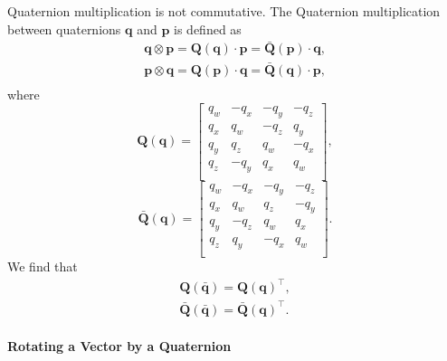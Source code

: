 \documentclass[12pt,a4paper,fleqn]{article}
\newcommand{\qx}[0]{\ensuremath{q_x}}
\newcommand{\qy}[0]{\ensuremath{q_y}}
\newcommand{\qz}[0]{\ensuremath{q_z}}
\newcommand{\qw}[0]{\ensuremath{q_w}}
\newcommand{\bVec}[1]{\mathbf{#1}}
\begin{document}
Quaternion multiplication is not commutative. 
The Quaternion multiplication between quaternions $\bVec{q}$ and $\bVec{p}$ is defined as
%
\begin{align}
\bVec{q} \otimes \bVec{p} = \bVec{Q}\left(\bVec{q}\right) \cdot \bVec{p} = \bar{\bVec{Q}}\left(\bVec{p}\right) \cdot \bVec{q},\\
%
\bVec{p} \otimes \bVec{q} = \bVec{Q}\left(\bVec{p}\right) \cdot \bVec{q} = \bar{\bVec{Q}}\left(\bVec{q}\right)\cdot \bVec{p},\\
\end{align}
%
where 
%
\begin{equation}
\bVec{Q}\left(\bVec{q}\right) = 
\begin{bmatrix} 
	\qw & -\qx & -\qy & -\qz \\ 
	\qx &  \qw & -\qz &  \qy \\
	\qy &  \qz &  \qw & -\qx \\
	\qz & -\qy &  \qx &  \qw \\
\end{bmatrix},
\end{equation}
%
\begin{equation}
\bar{\bVec{Q}}\left(\bVec{q}\right) = 
\begin{bmatrix} 
	\qw & -\qx & -\qy & -\qz \\ 
	\qx &  \qw &  \qz & -\qy \\
	\qy & -\qz &  \qw &  \qx \\
	\qz &  \qy & -\qx &  \qw \\
\end{bmatrix}.
\end{equation}
%
We find that
%
\begin{align}
\bVec{Q}\left(\bar{\bVec{q}}\right) = \bVec{Q}\left(\bVec{q}\right)^{\top},\\
\bar{\bVec{Q}}\left(\bar{\bVec{q}}\right) = \bar{\bVec{Q}}\left(\bVec{q}\right)^{\top}.
\end{align}

\paragraph{Rotating a Vector by a Quaternion}
\end{document}
